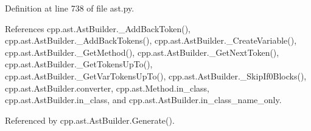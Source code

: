 Definition at line 738 of file ast.\+py.



References cpp.\+ast.\+Ast\+Builder.\+\_\+\+Add\+Back\+Token(), cpp.\+ast.\+Ast\+Builder.\+\_\+\+Add\+Back\+Tokens(), cpp.\+ast.\+Ast\+Builder.\+\_\+\+Create\+Variable(), cpp.\+ast.\+Ast\+Builder.\+\_\+\+Get\+Method(), cpp.\+ast.\+Ast\+Builder.\+\_\+\+Get\+Next\+Token(), cpp.\+ast.\+Ast\+Builder.\+\_\+\+Get\+Tokens\+Up\+To(), cpp.\+ast.\+Ast\+Builder.\+\_\+\+Get\+Var\+Tokens\+Up\+To(), cpp.\+ast.\+Ast\+Builder.\+\_\+\+Skip\+If0\+Blocks(), cpp.\+ast.\+Ast\+Builder.\+converter, cpp.\+ast.\+Method.\+in\+\_\+class, cpp.\+ast.\+Ast\+Builder.\+in\+\_\+class, and cpp.\+ast.\+Ast\+Builder.\+in\+\_\+class\+\_\+name\+\_\+only.



Referenced by cpp.\+ast.\+Ast\+Builder.\+Generate().



